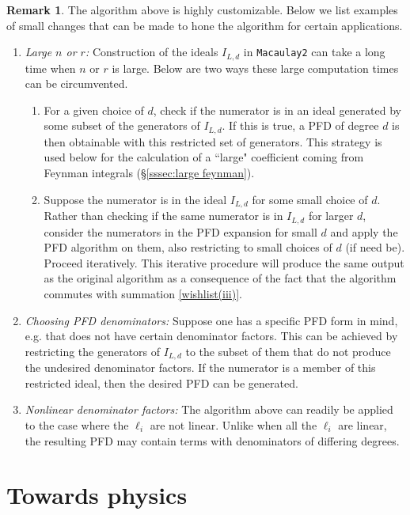 \documentclass [a4paper,reqno, 11pt]{amsart}
\theoremstyle{plain}
\theoremstyle{plain}
\theoremstyle{plain}
\theoremstyle{plain}
\theoremstyle{definition}
\theoremstyle{definition}
\theoremstyle{definition}
\newtheorem{remark}[theorem]{Remark}
\theoremstyle{definition}
\theoremstyle{definition}
\theoremstyle{definition}
\begin{document}
\begin{remark}
The algorithm above is highly customizable. Below we list examples of small changes that can be made to hone the algorithm for certain applications.
\begin{enumerate}
    \item \textit{Large $n$ or $r$:} Construction of the ideals $I_{L,d}$ in \texttt{Macaulay2} can take a long time when $n$ or $r$ is large. Below are two ways these large computation times can be circumvented.
    \begin{enumerate}
         \item  For a given choice of $d$, check if the numerator is in an ideal generated by some subset of the generators of $I_{L,d}$. If this is true, a PFD of degree $d$ is then obtainable with this restricted set of generators. This strategy is used below for the calculation of a ``large" coefficient coming from Feynman integrals (\S\ref{sssec:large feynman}).
        \item Suppose the numerator is in the ideal $I_{L,d}$ for some small choice of $d$. Rather than checking if the same numerator is in $I_{L,d}$ for larger $d$, consider the numerators in the PFD expansion for small $d$ and apply the PFD algorithm on them, also restricting to small choices of $d$ (if need be). Proceed iteratively. This iterative procedure will produce the same output as the original algorithm as a consequence of the fact that the algorithm commutes with summation \ref{wishlist(iii)}.
    \end{enumerate}
    \item \textit{Choosing PFD denominators:} Suppose one has a specific PFD form in mind, e.g. that does not have certain denominator factors. This can be achieved by restricting the generators of $I_{L,d}$ to the subset of them that do not produce the undesired denominator factors. If the numerator is a member of this restricted ideal, then the desired PFD can be generated. 
    \item \textit{Nonlinear denominator factors:} The algorithm above can readily be applied to the case where the $\ell_i$ are not linear. Unlike when all the $\ell_i$ are linear, the resulting PFD may contain terms with denominators of differing degrees.
\end{enumerate}    
\end{remark}



\section{Towards physics}\label{sec:physics}
\end{document}
